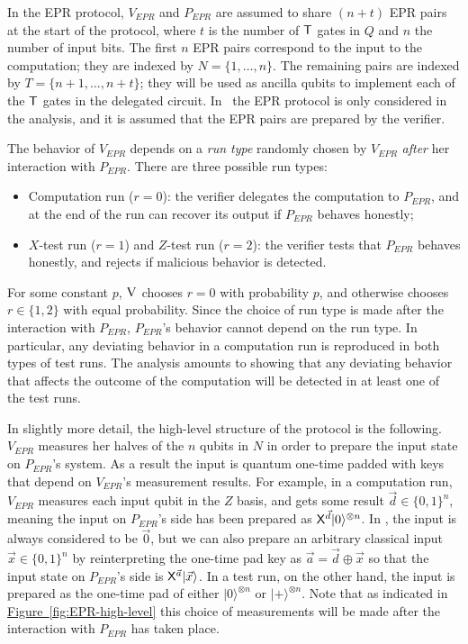 \documentclass[11pt]{article}
\numberwithin{equation}{section}
\theoremstyle{definition}
\theoremstyle{plain}
\newcommand{\expref}[2]{\hyperref[#2]{#1~\ref{#2}}}
\newcommand{\ket}[1]{|#1\rangle}
\newcommand{\ver}{\textsc{V}}
\begin{document}
In the EPR protocol, $V_{EPR}$ and $P_{EPR}$ are assumed to share $(n+t)$ EPR pairs at the start of the protocol, where $t$ is the number of $\sf T$ gates in $Q$ and $n$ the number of input bits. 
 The first $n$ EPR pairs correspond to the input to the computation; they are indexed by $N=\{1,\dots,n\}$. The remaining pairs are indexed by $T=\{n+1,\dots,n+t\}$; they will be used as ancilla qubits to  implement each of the $\sf T$ gates in the delegated circuit. 
 In~\cite{broadbent15howtoverify} the EPR protocol is only considered in the analysis, and it is assumed that the EPR pairs are prepared by the verifier.

The behavior of $V_{EPR}$ depends on a \emph{run type} randomly chosen by $V_{EPR}$ \emph{after} her interaction with $P_{EPR}$. There are three possible run types:
\begin{itemize}[nolistsep]
\item Computation run ($r=0$): the verifier delegates the computation to $P_{EPR}$, and at the end of the run can recover its output if $P_{EPR}$ behaves honestly;
\item $X$-test run ($r=1$) and $Z$-test run ($r=2$): the verifier tests that  $P_{EPR}$  behaves honestly, and rejects if malicious behavior is detected.
\end{itemize}
For some constant $p$, $\ver$ chooses $r=0$ with probability $p$, and otherwise chooses $r\in\{1,2\}$ with equal probability. Since the choice of run type is made after the interaction with $P_{EPR}$, $P_{EPR}$'s behavior cannot depend on the run type. In particular, any deviating behavior in a computation run is reproduced in both types of test runs. The analysis amounts to showing that any deviating behavior that affects the outcome of the computation will be detected in at least one of the test runs. 

In slightly more detail, the high-level structure of the protocol is the following. $V_{EPR}$ measures her halves of the $n$ qubits in $N$ in order to prepare the input state on $P_{EPR}$'s system. As a result the input is quantum one-time padded with keys that depend on $V_{EPR}$'s measurement results. For example, in a computation run, $V_{EPR}$ measures each input qubit in the $Z$ basis, and gets some result $\vec{d}\in\{0,1\}^n$, meaning the input on $P_{EPR}$'s side has been prepared as ${\sf X}^{\vec{d}}\ket{0}^{\otimes n}$. In \cite{broadbent15howtoverify}, the input is always considered to be $\vec{0}$, but we can also prepare an arbitrary classical input $\vec{x}\in\{0,1\}^n$ by reinterpreting the one-time pad key as $\vec{a}=\vec{d}\oplus \vec{x}$ so that the input state on $P_{EPR}$'s side is ${\sf X}^{\vec{a}}\ket{\vec{x}}$. In a test run, on the other hand, the input is prepared as the one-time pad of either $\ket{0}^{\otimes n}$ or $\ket{+}^{\otimes n}$. Note that as indicated in \expref{Figure}{fig:EPR-high-level} this choice of measurements will be made after the interaction with $P_{EPR}$ has taken place.
\end{document}
